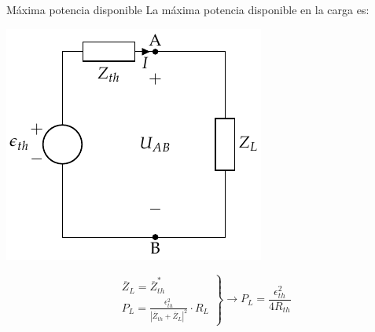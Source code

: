 \documentclass[aspectratio=169, usenames,svgnames,dvipsnames]{beamer}
\begin{document}
\begin{frame}[label={sec:org5c45c0d}]{Máxima potencia disponible}
La máxima potencia disponible en la carga es:
\begin{center}
\includegraphics[height=0.45\textheight]{../figs/EquivalenteThevenin.pdf}
\end{center}

\begin{equation*}
  \left.
    \begin{matrix}
      \overline{Z}_L = \overline{Z}_{th}^*\\
      P_L = \frac{\epsilon^2_{th}}{|\overline{Z}_{th} + \overline{Z}_L|^2} \cdot R_L
    \end{matrix} \right\}\rightarrow
  \boxed{P_L = \frac{\epsilon^2_{th}}{4 R_{th}}}
\end{equation*}
\end{frame}
\end{document}
